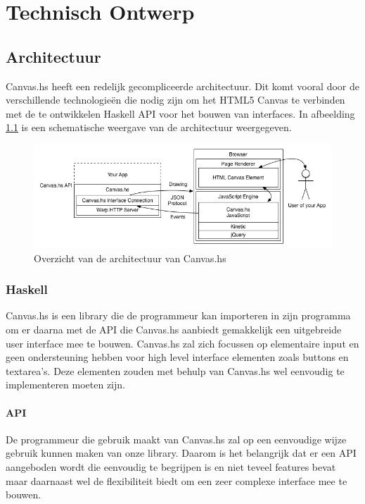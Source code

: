 \chapter{Technisch Ontwerp}
\section{Architectuur}
Canvas.hs heeft een redelijk gecompliceerde architectuur. Dit komt vooral door de verschillende technologieën die nodig zijn om het HTML5 Canvas te verbinden met de te ontwikkelen Haskell API voor het bouwen van interfaces. In afbeelding \ref{fig:overzicht_architectuur} is een schematische weergave van de architectuur weergegeven.

\begin{figure}
\begin{center}
\includegraphics[keepaspectratio,width=\textwidth]{./Hoofdstukken/architecture.png}
\caption{Overzicht van de architectuur van Canvas.hs}
\label{fig:overzicht_architectuur}
\end{center}
\end{figure}

\subsection{Haskell}
Canvas.hs is een library die de programmeur kan importeren in zijn programma om er daarna met de API die Canvas.hs aanbiedt gemakkelijk een uitgebreide user interface mee te bouwen. Canvas.hs zal zich focussen op elementaire input en geen ondersteuning hebben voor high level interface elementen zoals buttons en textarea's. Deze elementen zouden met behulp van Canvas.hs wel eenvoudig te implementeren moeten zijn.

\subsubsection{API}
De programmeur die gebruik maakt van Canvas.hs zal op een eenvoudige wijze gebruik kunnen maken van onze library. Daarom is het belangrijk dat er een API aangeboden wordt die eenvoudig te begrijpen is en niet teveel features bevat maar daarnaast wel de flexibiliteit biedt om een zeer complexe interface mee te bouwen.

